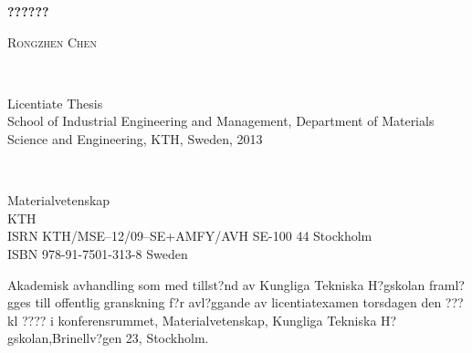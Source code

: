 \documentclass[a4paper, 12pt, titlepage,oneside,drop]{kthesis}
\begin{document}
\setcounter{page}{1}

\begin{center}




  \vspace{5 cm}





  \vspace{12pt}
  \textsc{\LARGE{\textbf{??????}}}
  \vspace{12pt}



  \vspace{5 cm}

  \textsc{\large{Rongzhen Chen}}


  \vfill %

  \ %

  \large{Licentiate Thesis}
  \\
  \large{School of Industrial Engineering and Management,
  Department of Materials Science and Engineering,
  KTH, Sweden, 2013}

\end{center}

 \thispagestyle{empty}


\newpage
\setcounter{page}{2}
\thispagestyle{empty}
\
\vfill

\begin{flushright}
 Materialvetenskap\\
 KTH\\
ISRN KTH/MSE--12/09--SE+AMFY/AVH
 \hfill SE-100 44 Stockholm\\ ISBN 978-91-7501-313-8  \hfill
Sweden\\
\end{flushright}


\vspace{5mm}

Akademisk avhandling som med tillst?nd av Kungliga Tekniska
H?gskolan framl?gges till offentlig granskning f?r avl?ggande av
licentiatexamen torsdagen den ???\linebreak 2013 kl ???? i
konferensrummet, Materialvetenskap, Kungliga Tekniska
H?gskolan,\linebreak Brinellv?gen 23, Stockholm.
\end{document}
